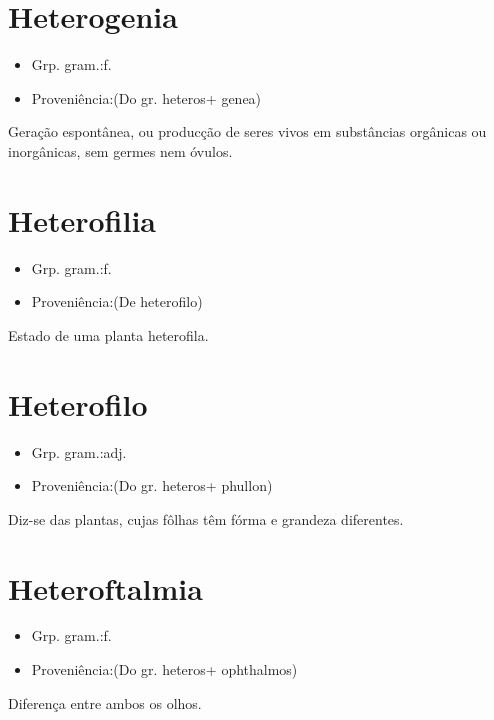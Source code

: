 \documentclass{article}
\begin{document}
\section{Heterogenia}
\begin{itemize}
\item {Grp. gram.:f.}
\end{itemize}
\begin{itemize}
\item {Proveniência:(Do gr. \textunderscore heteros\textunderscore  + \textunderscore genea\textunderscore )}
\end{itemize}
Geração espontânea, ou producção de seres vivos em substâncias orgânicas ou inorgânicas, sem germes nem óvulos.
\section{Heterofilia}
\begin{itemize}
\item {Grp. gram.:f.}
\end{itemize}
\begin{itemize}
\item {Proveniência:(De \textunderscore heterofilo\textunderscore )}
\end{itemize}
Estado de uma planta heterofila.
\section{Heterofilo}
\begin{itemize}
\item {Grp. gram.:adj.}
\end{itemize}
\begin{itemize}
\item {Proveniência:(Do gr. \textunderscore heteros\textunderscore  + \textunderscore phullon\textunderscore )}
\end{itemize}
Diz-se das plantas, cujas fôlhas têm fórma e grandeza diferentes.
\section{Heteroftalmia}
\begin{itemize}
\item {Grp. gram.:f.}
\end{itemize}
\begin{itemize}
\item {Proveniência:(Do gr. \textunderscore heteros\textunderscore  + \textunderscore ophthalmos\textunderscore )}
\end{itemize}
Diferença entre ambos os olhos.
\end{document}
